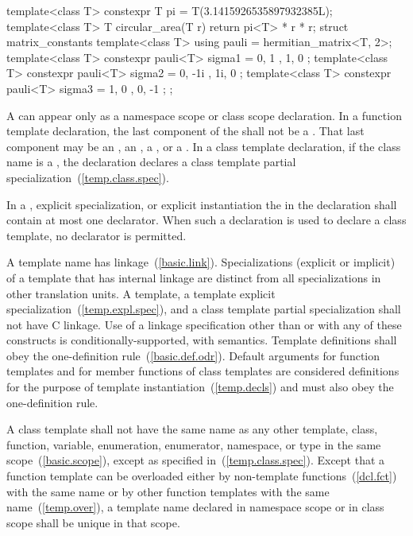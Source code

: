 \enterexample
\begin{codeblock}
template<class T>
  constexpr T pi = T(3.1415926535897932385L);
template<class T>
T circular_area(T r) {
  return pi<T> * r * r;
}
struct matrix_constants {
  template<class T>
   using pauli = hermitian_matrix<T, 2>;
  template<class T>
   constexpr pauli<T> sigma1 = { { 0, 1 }, { 1, 0 } };
  template<class T>
   constexpr pauli<T> sigma2 = { { 0, -1i }, { 1i, 0 } };
  template<class T>
   constexpr pauli<T> sigma3 = { { 1, 0 }, { 0, -1 } };
};
\end{codeblock}
\exitexample

\pnum
A
can appear only as a namespace scope or class scope declaration.
In a function template declaration, the last component of the
shall not be a
.
\enternote
That last component may be an , an ,
a , or a . In
a class template declaration, if the
class name
is a
,
the declaration declares a class template partial specialization~(\ref{temp.class.spec}).
\exitnote

\pnum
In a
,
explicit specialization, or explicit instantiation the
in the declaration shall contain at most one declarator.
When such a declaration is used to declare a class template,
no declarator is permitted.

\pnum
{}%
A template name has linkage~(\ref{basic.link}).
Specializations (explicit or implicit) of
a template that has internal linkage are
distinct from all specializations in other translation
units.
A template, a template explicit specialization~(\ref{temp.expl.spec}), and a class
template partial specialization shall not have C linkage. Use of a linkage specification
other than  or  with any of these constructs is
conditionally-supported, with
 semantics.
Template definitions shall obey the one-definition rule~(\ref{basic.def.odr}).
\enternote
Default arguments for function templates and for member functions of
class templates are considered definitions for the purpose of template
instantiation~(\ref{temp.decls}) and must also obey the one-definition rule.
\exitnote

\pnum
A class template shall not have the same name as any other
template, class, function, variable, enumeration, enumerator, namespace, or
type in the same scope~(\ref{basic.scope}), except as specified in~(\ref{temp.class.spec}).
Except that a function template can be overloaded either by non-template
functions~(\ref{dcl.fct}) with the same name or by other function templates
with the same name~(\ref{temp.over}),
a template name declared in namespace scope or in class scope shall be unique
in that scope.

